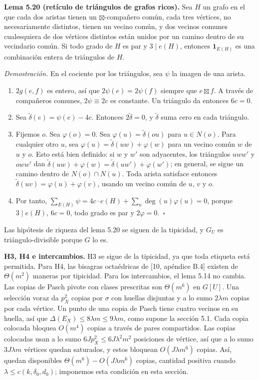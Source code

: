 \documentclass[spanish,11pt,a4paper]{article}
\providecommand{\tightlist}{\setlength{\itemsep}{0pt}\setlength{\parskip}{0pt}}
\begin{document}
\textbf{Lema 5.20 (retículo de triángulos de grafos ricos).} Sea \(H\) un grafo en el que cada dos aristas tienen un \(\boxtimes\)-compañero común, cada tres vértices, no necesariamente distintos, tienen un vecino común, y dos vecinos comunes cualesquiera de dos vértices distintos están unidos por un camino dentro de su vecindario común. Si todo grado de \(H\) es par y \(3\mid e(H)\), entonces \(\mathbf 1_{E(H)}\) es una combinación entera de triángulos de \(H\).

\emph{Demostración.} En el cociente por los triángulos, sea \(\psi\) la imagen de una arista.

\begin{enumerate}
\def\labelenumi{\arabic{enumi}.}
\tightlist
\item
  \(2g(e,f)\) es entero, así que \(2\psi(e)=2\psi(f)\) siempre que \(e\boxtimes f\). A través de compañeros comunes, \(2\psi\equiv2c\) es constante. Un triángulo da entonces \(6c=0\).
\item
  Sea \(\tilde\delta(e)=\psi(e)-4c\). Entonces \(2\tilde\delta=0\), y \(\tilde\delta\) suma cero en cada triángulo.
\item
  Fijemos \(o\). Sea \(\varphi(o)=0\). Sea \(\varphi(u)=\tilde\delta(ou)\) para \(u\in N(o)\). Para cualquier otro \(u\), sea \(\varphi(u)=\tilde\delta(uw)+\varphi(w)\) para un vecino común \(w\) de \(u\) y \(o\). Esto está bien definido: si \(w\) y \(w'\) son adyacentes, los triángulos \(uww'\) y \(oww'\) dan \(\tilde\delta(uw)+\varphi(w)=\tilde\delta(uw')+\varphi(w')\); en general, se sigue un camino dentro de \(N(o)\cap N(u)\). Toda arista satisface entonces \(\tilde\delta(uv)=\varphi(u)+\varphi(v)\), usando un vecino común de \(u\), \(v\) y \(o\).
\item
  Por tanto, \(\sum_{E(H)}\psi=4c\cdot e(H)+\sum_u\deg(u)\varphi(u)=0\), porque \(3\mid e(H)\), \(6c=0\), todo grado es par y \(2\varphi=0\).~\(\square\)
\end{enumerate}

Las hipótesis de riqueza del lema 5.20 se siguen de la tipicidad, y \(G_U\) es triángulo-divisible porque \(G\) lo es.

\textbf{H3, H4 e intercambios.} H3 se sigue de la tipicidad, ya que toda etiqueta está permitida. Para H4, las bisagras octaédricas de {[}10, apéndice B.4{]} existen de \(\Theta(m^2)\) maneras por tipicidad. Para los intercambios, el lema 5.14 no cambia. Las copias de Pasch pivote con clases prescritas son \(\Theta(m^6)\) en \(G[U]\). Una selección voraz da \(p_X^2\) copias por \(\sigma\) con huellas disjuntas y a lo sumo \(2\lambda m\) copias por cada vértice. Un punto de una copia de Pasch tiene cuatro vecinos en su huella, así que \(\Delta(E_X)\le8\lambda m\le9\lambda m\), como supone la sección 5.1. Cada copia colocada bloquea \(O(m^4)\) copias a través de pares compartidos. Las copias colocadas usan a lo sumo \(6Jp_X^2\le6J\lambda^2m^2\) posiciones de vértice, así que a lo sumo \(3J\lambda m\) vértices quedan saturados, y estos bloquean \(O(J\lambda m^6)\) copias. Así, quedan disponibles \(\Theta(m^6)-O(J\lambda m^6)\) copias, cantidad positiva cuando \(\lambda\le c(k,\delta_0,d_0)\); imponemos esta condición en esta sección.
\end{document}
